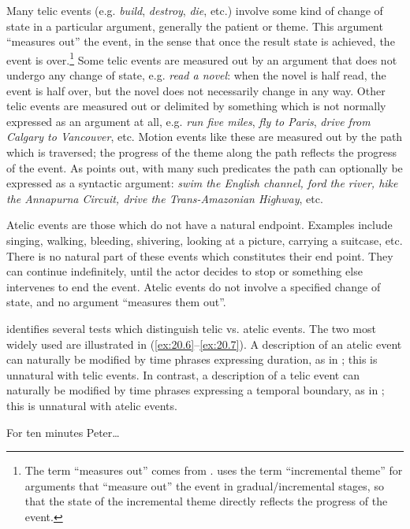 Many telic events (e.g. \textit{build}, \textit{destroy}, \textit{die}, etc.) involve some kind of change of state in a particular argument, generally the patient or theme. This argument “measures out” the event, in the sense that once the result state is achieved, the event is over.\footnote{The term “measures out” comes from \citet{Tenny1987}. \citet{Dowty1991} uses the term “incremental theme” for arguments that “measure out” the event in gradual/incremental stages, so that the state of the incremental theme directly reflects the progress of the event.} Some telic events are measured out by an argument that does not undergo any change of state, e.g. \textit{read a novel}: when the novel is half read, the event is half over, but the novel does not necessarily change in any way. Other telic events are measured out or delimited by something which is not normally expressed as an argument at all, e.g. \textit{run five miles}, \textit{fly to Paris}, \textit{drive from Calgary to Vancouver}, etc. Motion events like these are measured out by the path which is traversed; the progress of the theme along the path reflects the progress of the event. As \citet{Dowty1991} points out, with many such predicates the path can optionally be expressed as a syntactic argument: \textit{swim the English channel, ford the river, hike the Annapurna Circuit, drive the Trans-Amazonian Highway}, etc.



Atelic events are those which do not have a natural endpoint. Examples include singing, walking, bleeding, shivering, looking at a picture, carrying a suitcase, etc. There is no natural part of these events which constitutes their end point. They can continue indefinitely, until the actor decides to stop or something else intervenes to end the event. Atelic events do not involve a specified change of state, and no argument “measures them out”.



\citet{Dowty1979} identifies several tests which distinguish telic vs. atelic events. The two most widely used are illustrated in (\ref{ex:20.6}--\ref{ex:20.7}). A description of an atelic event can naturally be modified by time phrases expressing duration, as in ; this is unnatural with telic events. In contrast, a description of a telic event can naturally be modified by time phrases expressing a temporal boundary, as in ; this is unnatural with atelic events.


\ea \label{ex:20.6}
For ten minutes Peter…\\
                       \z
\z

